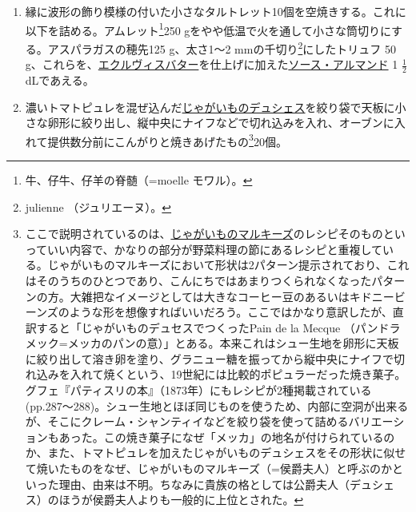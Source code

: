\begin{recette}
\begin{enumerate}
\def\labelenumi{\arabic{enumi}.}
\item
  縁に波形の飾り模様の付いた小さなタルトレット10個を空焼きする。これに以下を詰める。アムレット\footnote{牛、仔牛、仔羊の脊髄（=moelle
    モワル）。}250
  gをやや低温で火を通して小さな筒切りにする。アスパラガスの穂先125
  g、太さ1〜2 mmの千切り\footnote{julienne （ジュリエーヌ）。}にしたトリュフ
  50
  g、これらを、\protect\hyperlink{beurre-d-ecrevisse}{エクルヴィスバター}を仕上げに加えた\protect\hyperlink{sauce-allemande}{ソース・アルマンド}
  1 \(\frac{1}{2}\) dLであえる。
\item
  濃いトマトピュレを混ぜ込んだ\protect\hyperlink{pommes-de-terre-duchesse}{じゃがいものデュシェス}を絞り袋で天板に小さな卵形に絞り出し、縦中央にナイフなどで切れ込みを入れ、オーブンに入れて提供数分前にこんがりと焼きあげたもの\footnote{ここで説明されているのは、\protect\hyperlink{pommes-de-terre-marquise}{じゃがいものマルキーズ}のレシピそのものといっていい内容で、かなりの部分が野菜料理の節にあるレシピと重複している。じゃがいものマルキーズにおいて形状は2パターン提示されており、これはそのうちのひとつであり、こんにちではあまりつくられなくなったパターンの方。大雑把なイメージとしては大きなコーヒー豆のあるいはキドニービーンズのような形を想像すればいいだろう。ここではかなり意訳したが、直訳すると「じゃがいものデュセスでつくったPain
    de la Mecque
    （パンドラメック=メッカのパンの意）」とある。本来これはシュー生地を卵形に天板に絞り出して溶き卵を塗り、グラニュー糖を振ってから縦中央にナイフで切れ込みを入れて焼くという、19世紀には比較的ポピュラーだった焼き菓子。グフェ『パティスリの本』（1873年）にもレシピが2種掲載されている
    (pp.287〜288)。シュー生地とほぼ同じものを使うため、内部に空洞が出来るが、そこにクレーム・シャンティイなどを絞り袋を使って詰めるバリエーションもあった。この焼き菓子になぜ「メッカ」の地名が付けられているのか、また、トマトピュレを加えたじゃがいものデュシェスをその形状に似せて焼いたものをなぜ、じゃがいものマルキーズ（=侯爵夫人）と呼ぶのかといった理由、由来は不明。ちなみに貴族の格としては公爵夫人（デュシェス）のほうが侯爵夫人よりも一般的に上位とされた。}20個。
\end{enumerate}

\atoaki{}

\hypertarget{garniture-a-la-marseillaise}{%
}
\end{recette}
